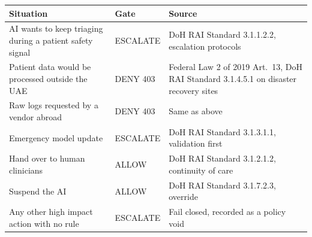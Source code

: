 \documentclass[10pt,twocolumn]{article}
\begin{document}
\par\medskip\noindent\begin{minipage}{\columnwidth}\centering\footnotesize
\begin{tabularx}{\columnwidth}{@{}LlL@{}}
\toprule
\textbf{Situation} & \textbf{Gate} & \textbf{Source}\\
\midrule
AI wants to keep triaging during a patient safety signal & \textcolor{escc}{ESCALATE} & DoH RAI Standard 3.1.1.2.2, escalation protocols\\
Patient data would be processed outside the UAE & \textcolor{denyc}{DENY 403} & Federal Law 2 of 2019 Art.~13, DoH RAI Standard 3.1.4.5.1 on disaster recovery sites\\
Raw logs requested by a vendor abroad & \textcolor{denyc}{DENY 403} & Same as above\\
Emergency model update & \textcolor{escc}{ESCALATE} & DoH RAI Standard 3.1.3.1.1, validation first\\
Hand over to human clinicians & \textcolor{okc}{ALLOW} & DoH RAI Standard 3.1.2.1.2, continuity of care\\
Suspend the AI & \textcolor{okc}{ALLOW} & DoH RAI Standard 3.1.7.2.3, override\\
Any other high impact action with no rule & \textcolor{escc}{ESCALATE} & Fail closed, recorded as a policy void\\
\bottomrule
\end{tabularx}
\label{tab:rules}
\end{minipage}\par\medskip
\end{document}
